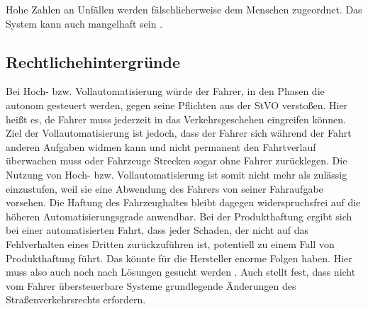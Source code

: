 Hohe Zahlen an Unfällen werden fälschlicherweise dem Menschen zugeordnet. Das System kann auch mangelhaft sein \parencite[S.147]{Huguenin.2017}. %


\subsection{Rechtlichehintergründe}%

Bei Hoch- bzw. Vollautomatisierung würde der Fahrer, in den Phasen die autonom gesteuert werden, gegen seine Pflichten aus der StVO verstoßen. Hier heißt es, de Fahrer muss jederzeit in das Verkehrsgeschehen eingreifen können. Ziel der Vollautomatisierung ist jedoch, dass der Fahrer sich während der Fahrt anderen Aufgaben widmen kann und nicht permanent den Fahrtverlauf überwachen muss oder Fahrzeuge Strecken sogar ohne Fahrer zurücklegen. Die Nutzung von Hoch- bzw. Vollautomatisierung ist somit nicht mehr als zulässig einzustufen, weil sie eine Abwendung des Fahrers von seiner Fahraufgabe vorsehen. Die Haftung des Fahrzeughaltes bleibt dagegen widerspruchsfrei auf die höheren Automatisierungsgrade anwendbar. Bei der Produkthaftung ergibt sich bei einer automatisierten Fahrt, dass jeder Schaden, der nicht auf das Fehlverhalten eines Dritten zurückzuführen ist, potentiell zu einem Fall von Produkthaftung führt. Das könnte für die Hersteller enorme Folgen haben. Hier muss also auch noch nach Lösungen gesucht werden \parencite[S.6-7]{Gasser.2011}. Auch \Textcite[S.8]{Mages.2008} stellt fest, dass nicht vom Fahrer übersteuerbare Systeme grundlegende Änderungen des Straßenverkehrsrechts erfordern.